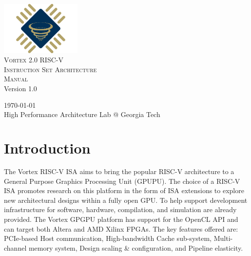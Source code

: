 \documentclass{book}
\newcommand{\clearandresetpage}{%
  \clearpage
  \setcounter{page}{1}%
}
\begin{document}
\begin{titlepage}
    \centering
    \vspace*{0.5cm}
    \includegraphics[width=0.3\textwidth]{assets/vortex-logo.png}\\[1cm] 
    
    \textsc{\Huge Vortex 2.0 RISC-V\\[0.5cm] Instruction Set Architecture\\[0.5cm] Manual}\\[2cm] %
    
    \large Version 1.0\\[2cm] %
    
    \vfill
    
    {\large \today}\\[0.5cm] %
    {\large High Performance Architecture Lab @ Georgia Tech}\\[0.5cm] %
    
\end{titlepage}

\clearandresetpage %

\tableofcontents %

\clearandresetpage %

\chapter{Introduction}
The Vortex RISC-V ISA aims to bring the popular RISC-V architecture to a General Purpose Graphics Processing Unit (GPUPU). The choice of a RISC-V ISA promotes research on this platform in the form of ISA extensions to explore new architectural designs within a fully open GPU. To help support development infrastructure for software, hardware, compilation, and simulation are already provided. The Vortex GPGPU platform has support for the OpenCL API and can target both Altera and AMD Xilinx FPGAs. The key features offered are: PCIe-based Host communication, High-bandwidth Cache sub-system, Multi-channel memory system, Design scaling \& configuration, and Pipeline elasticity.\\
\end{document}
